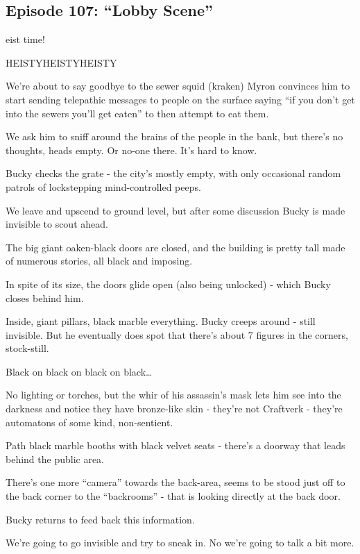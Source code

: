 \subsection{Episode 107: ``Lobby Scene''}

eist time!\medskip

HEISTYHEISTYHEISTY\medskip

We’re about to say goodbye to the sewer squid (kraken) Myron convinces him to start sending telepathic messages to people on the surface saying “if you don’t get into the sewers you’ll get eaten” to then attempt to eat them.\medskip

We ask him to sniff around the brains of the people in the bank, but there’s no thoughts, heads empty. Or no-one there. It’s hard to know.\medskip

Bucky checks the grate - the city’s mostly empty, with only occasional random patrols of lockstepping mind-controlled peeps.\medskip

We leave and upscend to ground level, but after some discussion Bucky is made invisible to scout ahead.\medskip

The big giant oaken-black doors are closed, and the building is pretty tall made of numerous stories, all black and imposing.\medskip

In spite of its size, the doors glide open (also being unlocked) - which Bucky closes behind him.\medskip

Inside, giant pillars, black marble everything. Bucky creeps around - still invisible. But he eventually does spot that there’s about 7 figures in the corners, stock-still.\medskip

Black on black on black on black…\medskip

No lighting or torches, but the whir of his assassin’s mask lets him see into the darkness and notice they have bronze-like skin - they’re not Craftverk - they’re automatons of some kind, non-sentient.\medskip

Path black marble booths with black velvet seats - there’s a doorway that leads behind the public area.\medskip

There’s one more “camera” towards the back-area, seems to be stood just off to the back corner to the “backrooms” - that is looking directly at the back door.\medskip

Bucky returns to feed back this information.\medskip

We’re going to go invisible and try to sneak in. No we’re going to talk a bit more.\medskip

